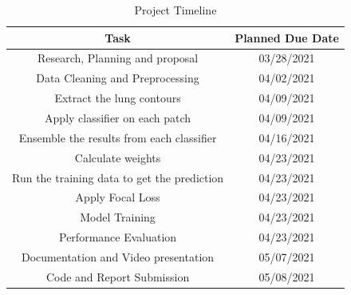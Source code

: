 \documentclass{sigkddExp}
\begin{document}
\begin{table}[H]
    \centering
    \caption{Project Timeline}
    \begin{tabular}{|c|c|} \hline
        Task&Planned Due Date\\ \hline
        Research, Planning and proposal &03/28/2021\\ \hline
        Data Cleaning and Preprocessing & 04/02/2021\\ \hline
        Extract the lung contours & 04/09/2021\\ \hline
        Apply classifier on each patch & 04/09/2021\\ \hline
        Ensemble the results from each classifier & 04/16/2021\\ \hline
        Calculate weights & 04/23/2021 \\ \hline
        Run the training data to get the prediction & 04/23/2021 \\ \hline
        Apply Focal Loss & 04/23/2021 \\ \hline
        Model Training & 04/23/2021 \\ \hline
        Performance Evaluation & 04/23/2021 \\ \hline
        Documentation and Video presentation & 05/07/2021 \\ \hline
        Code and Report Submission & 05/08/2021 \\
        \hline\end{tabular}
    \end{table}
    
    
    
    
\end{document}
